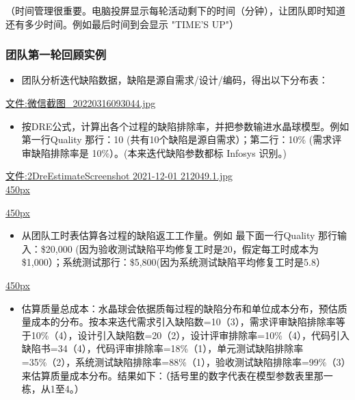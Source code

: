 \documentclass[]{article}
\date{}
\providecommand{\tightlist}{%
  \setlength{\itemsep}{0pt}\setlength{\parskip}{0pt}}
\begin{document}
\begin{description}
\tightlist
\item[]
（时间管理很重要。电脑投屏显示每轮活动剩下的时间（分钟），让团队即时知道还有多少时间。例如最后时间到会显示
"TIME'S UP"）
\end{description}

\hypertarget{ux56e2ux961fux7b2cux4e00ux8f6eux56deux987eux5b9eux4f8b}{%
\subsubsection{团队第一轮回顾实例}\label{ux56e2ux961fux7b2cux4e00ux8f6eux56deux987eux5b9eux4f8b}}

\begin{itemize}
\tightlist
\item
  团队分析迭代缺陷数据，缺陷是源自需求/设计/编码，得出以下分布表：
\end{itemize}

\url{文件:微信截图_20220316093044.jpg}

\begin{itemize}
\tightlist
\item
  按DRE公式，计算出各个过程的缺陷排除率，并把参数输进水晶球模型。例如
  第一行Quality 那行：10 (共有10个缺陷是源自需求）；第二行：10\%
  (需求评审缺陷排除率是 10\%）。(本来迭代缺陷参数都标 Infosys 识别。)
\end{itemize}

\href{文件:2DreEstimateScreenshot_2021-12-01_212049.1.jpg}{文件:2DreEstimateScreenshot
2021-12-01 212049.1.jpg}\\
\href{文件:微信截图_20231031153027.png}{450px}

\href{文件:4reworkByPhaseScreenshot_2021-12-01_214838.1.jpg}{450px}

\begin{itemize}
\tightlist
\item
  从团队工时表估算各过程的缺陷返工工作量。例如 最下面一行Quality
  那行输入：\$20,000 (因为验收测试缺陷平均修复工时是20，假定每工时成本为
  \$1,000）；系统测试那行：\$5,800(因为系统测试缺陷平均修复工时是5.8）
\end{itemize}

\href{文件:微信截图_20231031153355.png}{450px}

\begin{itemize}
\tightlist
\item
  估算质量总成本：水晶球会依据质每过程的缺陷分布和单位成本分布，预估质量成本的分布。按本来迭代需求引入缺陷数=10（3），需求评审缺陷排除率等于10\%（4），设计引入缺陷数=20（2），设计评审排除率=10\%（4），代码引入缺陷书=34（4），代码评审排除率=18\%（1），单元测试缺陷排除率=35\%（2），系统测试缺陷排除率=88\%（1），验收测试缺陷排除率=99\%（3）来估算质量成本分布。结果如下：（括号里的数字代表在模型参数表里那一栋，从1至4。）
\end{itemize}
\end{document}
